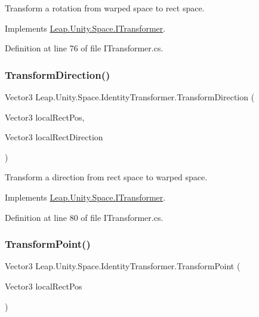 Transform a rotation from warped space to rect space. 



Implements \mbox{\hyperlink{interface_leap_1_1_unity_1_1_space_1_1_i_transformer_abfcf877e117b7f70b2ce60259b88c459}{Leap.\+Unity.\+Space.\+I\+Transformer}}.



Definition at line 76 of file I\+Transformer.\+cs.

\mbox{\label{class_leap_1_1_unity_1_1_space_1_1_identity_transformer_a653673b36d9de3f837033af24b75da49}} 
\subsubsection{\texorpdfstring{TransformDirection()}{TransformDirection()}}
{\footnotesize\ttfamily Vector3 Leap.\+Unity.\+Space.\+Identity\+Transformer.\+Transform\+Direction (\begin{DoxyParamCaption}\item[{Vector3}]{local\+Rect\+Pos,  }\item[{Vector3}]{local\+Rect\+Direction }\end{DoxyParamCaption})}



Transform a direction from rect space to warped space. 



Implements \mbox{\hyperlink{interface_leap_1_1_unity_1_1_space_1_1_i_transformer_a86883dfa18d51d4254dff56b1d9f5024}{Leap.\+Unity.\+Space.\+I\+Transformer}}.



Definition at line 80 of file I\+Transformer.\+cs.

\mbox{\label{class_leap_1_1_unity_1_1_space_1_1_identity_transformer_ab0c7ba8c98e532237b23e6bffb67becd}} 
\subsubsection{\texorpdfstring{TransformPoint()}{TransformPoint()}}
{\footnotesize\ttfamily Vector3 Leap.\+Unity.\+Space.\+Identity\+Transformer.\+Transform\+Point (\begin{DoxyParamCaption}\item[{Vector3}]{local\+Rect\+Pos }\end{DoxyParamCaption})}



